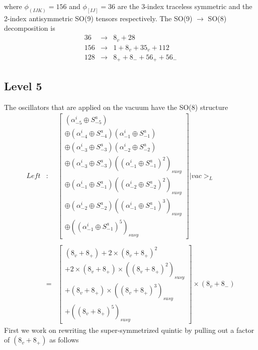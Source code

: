 where $\phi _{(IJK)}=156$ and $\phi _{[IJ]}=36$ are the 3-index traceless
symmetric and the 2-index antisymmetric SO(9) tensors respectively. The
SO(9) $\rightarrow $ SO(8) decomposition is
\begin{eqnarray}
36 &\rightarrow &8_v+28 \\
156 &\rightarrow &1+8_v+35_v+112  \nonumber \\
128 &\rightarrow &8_{+}+8_{-}+56_{+}+56_{-}  \nonumber
\end{eqnarray}

\subsection{Level 5}

The oscillators that are applied on the vacuum have the SO(8) structure
\begin{eqnarray}
{Left} &:&\left[
\begin{array}{c}
(\alpha _{-5}^i\oplus S_{-5}^a) \\
\oplus (\alpha _{-4}^i\oplus S_{-4}^a)(\alpha _{-1}^i\oplus S_{-1}^a) \\
\oplus (\alpha _{-3}^i\oplus S_{-3}^a)(\alpha _{-2}^i\oplus S_{-2}^a) \\
\oplus (\alpha _{-3}^i\oplus S_{-3}^a)\left( (\alpha _{-1}^i\oplus
S_{-1}^a)^2\right) _{susy} \\
\oplus (\alpha _{-1}^i\oplus S_{-1}^a)\left( (\alpha _{-2}^i\oplus
S_{-2}^a)^2\right) _{susy} \\
\oplus (\alpha _{-2}^i\oplus S_{-2}^a)\left( (\alpha _{-1}^i\oplus
S_{-1}^a)^3\right) _{susy} \\
\oplus \left( (\alpha _{-1}^i\oplus S_{-1}^a)^5\right) _{susy}
\end{array}
\right] |{vac}>_L  \nonumber  \label{left5} \\
&&  \label{left5} \\
\  &=&\left[
\begin{array}{c}
(8_v+8_{+})+2\times (8_v+8_{+})^2 \\
+2\times (8_v+8_{+})\times \left( (8_v+8_{+})^2\right) _{susy} \\
+(8_v+8_{+})\times \left( (8_v+8_{+})^3\right) _{susy} \\
+\left( (8_v+8_{+})^5\right) _{susy}
\end{array}
\right] \times (8_v+8_{-})  \nonumber  \label{left5}
\end{eqnarray}
First we work on rewriting the super-symmetrized quintic by pulling out a
factor of $(8_v+8_{+})$ as follows

